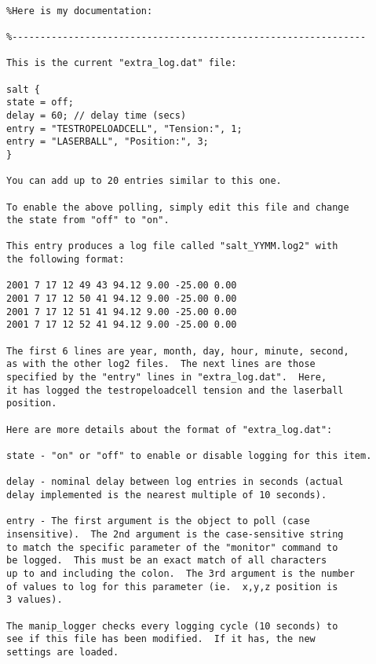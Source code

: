 \begin{verbatim}

%Here is my documentation:

%--------------------------------------------------------------- 

This is the current "extra_log.dat" file:

salt {
state = off;
delay = 60; // delay time (secs)
entry = "TESTROPELOADCELL", "Tension:", 1;
entry = "LASERBALL", "Position:", 3;
}

You can add up to 20 entries similar to this one.

To enable the above polling, simply edit this file and change
the state from "off" to "on".

This entry produces a log file called "salt_YYMM.log2" with
the following format:

2001 7 17 12 49 43 94.12 9.00 -25.00 0.00
2001 7 17 12 50 41 94.12 9.00 -25.00 0.00
2001 7 17 12 51 41 94.12 9.00 -25.00 0.00
2001 7 17 12 52 41 94.12 9.00 -25.00 0.00

The first 6 lines are year, month, day, hour, minute, second,
as with the other log2 files.  The next lines are those
specified by the "entry" lines in "extra_log.dat".  Here,
it has logged the testropeloadcell tension and the laserball
position.

Here are more details about the format of "extra_log.dat":

state - "on" or "off" to enable or disable logging for this item.

delay - nominal delay between log entries in seconds (actual
delay implemented is the nearest multiple of 10 seconds).

entry - The first argument is the object to poll (case
insensitive).  The 2nd argument is the case-sensitive string
to match the specific parameter of the "monitor" command to
be logged.  This must be an exact match of all characters
up to and including the colon.  The 3rd argument is the number
of values to log for this parameter (ie.  x,y,z position is
3 values).

The manip_logger checks every logging cycle (10 seconds) to
see if this file has been modified.  If it has, the new
settings are loaded.

\end{verbatim}

